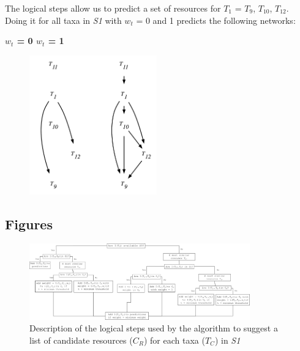 \documentclass[letterpaper]{article}
\begin{document}
The logical steps allow us to predict a set of resources for $T_1$ = {$T_9$, $T_{10}$, $T_{12}$}. Doing it for all taxa in \textit{S1} with $w_t$ = 0 and 1 predicts the following networks:
\bigskip

\centerline{\textbf{$w_t$ = 0 \quad \quad \quad \quad \quad $w_t$ = 1} \quad}
    \begin{figure}[h!]
    \centering\includegraphics[height = 6cm]{example.pdf}
    \end{figure}

\newpage
\subsection{Figures}
    \begin{figure}[h]
      \centering\includegraphics[width=0.85\textwidth]{Decision_Diagram.png}
      \caption{Description of the logical steps used by the algorithm to suggest a list of candidate resources ($C_R$) for each taxa ($T_C$) in \textit{S1}}
      \label{fig:decision_diag}
    \end{figure}
\end{document}
